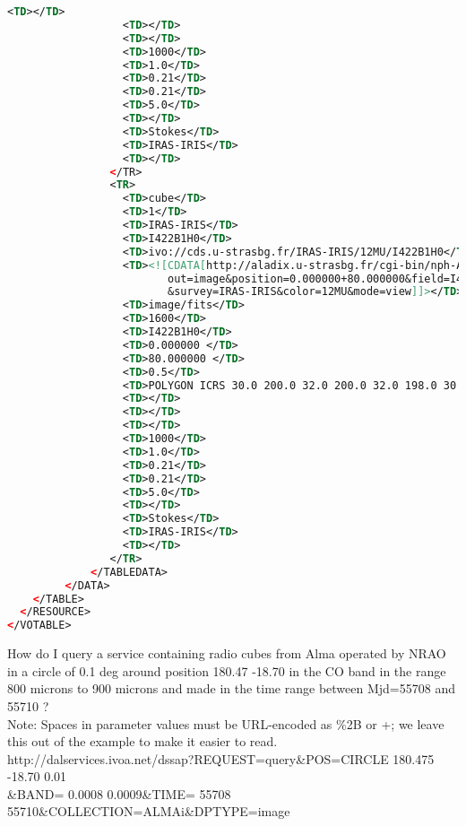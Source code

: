 \documentclass[11pt,a4paper]{ivoa}
\begin{document}
\begin{lstlisting}[basicstyle=\scriptsize,language=XML]
                  <TD></TD> 
                  <TD></TD> 
                  <TD></TD> 
                  <TD>1000</TD> 
                  <TD>1.0</TD> 
                  <TD>0.21</TD> 
                  <TD>0.21</TD> 
                  <TD>5.0</TD> 
                  <TD></TD> 
                  <TD>Stokes</TD> 
                  <TD>IRAS-IRIS</TD> 
                  <TD></TD> 
                </TR> 
                <TR> 
                  <TD>cube</TD> 
                  <TD>1</TD> 
                  <TD>IRAS-IRIS</TD> 
                  <TD>I422B1H0</TD> 
                  <TD>ivo://cds.u-strasbg.fr/IRAS-IRIS/12MU/I422B1H0</TD> 
                  <TD><![CDATA[http://aladix.u-strasbg.fr/cgi-bin/nph-Aladin++dev.cgi?
                         out=image&position=0.000000+80.000000&field=I422B1H0
                         &survey=IRAS-IRIS&color=12MU&mode=view]]></TD> 
                  <TD>image/fits</TD> 
                  <TD>1600</TD> 
                  <TD>I422B1H0</TD> 
                  <TD>0.000000 </TD> 
                  <TD>80.000000 </TD> 
                  <TD>0.5</TD> 
                  <TD>POLYGON ICRS 30.0 200.0 32.0 200.0 32.0 198.0 30.0 198.0</TD> 
                  <TD></TD> 
                  <TD></TD> 
                  <TD></TD> 
                  <TD>1000</TD> 
                  <TD>1.0</TD> 
                  <TD>0.21</TD> 
                  <TD>0.21</TD> 
                  <TD>5.0</TD> 
                  <TD></TD> 
                  <TD>Stokes</TD> 
                  <TD>IRAS-IRIS</TD> 
                  <TD></TD> 
                </TR>
             </TABLEDATA> 
         </DATA> 
    </TABLE> 
  </RESOURCE> 
</VOTABLE>
\end{lstlisting}
         How do I query a service containing radio cubes from Alma operated by NRAO in a circle of 0.1 deg around position 180.47 -18.70 in the CO band in the range 800 microns to 900 microns and made in the time range between Mjd=55708 and 55710 ? \\
Note: Spaces in parameter values must be URL-encoded as \%2B or +; we leave this out of the example to make it easier to read.\\
{\footnotesize http://dalservices.ivoa.net/dssap?REQUEST=query\&POS=CIRCLE 180.475 -18.70 0.01 \\ \&BAND= 0.0008 0.0009\&TIME= 55708 55710\&COLLECTION=ALMAi\&DPTYPE=image} 
\end{document}

